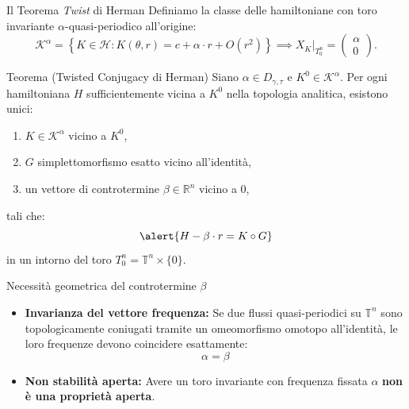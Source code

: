 \documentclass[10pt,aspectratio=169]{beamer}
\newcommand{\T}{\mathbb{T}}
\newcommand{\R}{\mathbb{R}}
\newcommand{\blu}[1]{\textcolor{UniBlue}{\textbf{#1}}}
\begin{document}
\begin{frame}{Il Teorema \textit{Twist} di Herman}
  Definiamo la classe delle hamiltoniane con toro invariante $\alpha$-quasi-periodico all'origine:
  \[
    \mathcal{K}^\alpha = \left\{ K \in \mathcal{H} : K(\theta, r) = c + \alpha \cdot r + O(r^2) \right\} \implies X_K|_{T^n_0} = \begin{pmatrix} \alpha \\ 0 \end{pmatrix}.
  \]
  \begin{block}{Teorema (Twisted Conjugacy di Herman)}
    Siano $\alpha \in D_{\gamma, \tau}$ e $K^0 \in \mathcal{K}^\alpha$. Per ogni hamiltoniana $H$ sufficientemente vicina a $K^0$ nella topologia analitica, esistono unici:
    \begin{enumerate}
      \item $K \in \mathcal{K}^\alpha$ vicino a $K^0$,
      \item $G$ simplettomorfismo esatto vicino all'identità,
      \item un vettore di controtermine $\beta \in \R^n$ vicino a $0$,
    \end{enumerate}
    tali che:
    \[
      \alert{H - \beta \cdot r = K \circ G}
    \]
    in un intorno del toro $T_0^n = \T^n \times \{0\}$.
  \end{block}
\end{frame}

\begin{frame}{Necessità geometrica del controtermine $\beta$}
  \begin{itemize}
    \item \blu{Invarianza del vettore frequenza:} Se due flussi quasi-periodici su $\T^n$ sono topologicamente coniugati tramite un omeomorfismo omotopo all'identità, le loro frequenze devono coincidere esattamente:
    \[
      \alpha = \beta
    \]
    \item \blu{Non stabilità aperta:} Avere un toro invariante con frequenza fissata $\alpha$ \textbf{non è una proprietà aperta}.
  \end{itemize}
\end{frame}
\end{document}
